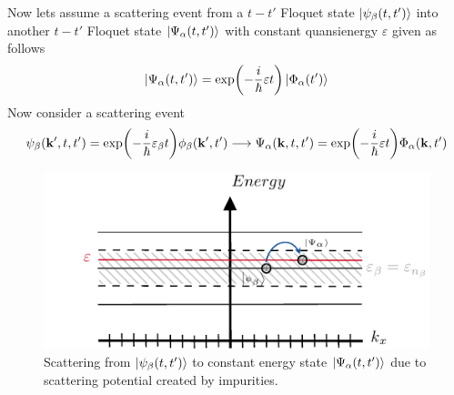 \vspace{5mm}
\noindent
Now lets assume a scattering event from a $t-t'$ Floquet state $\ket{\psi_{\beta}(t,t')}$ into another $t-t'$ Floquet state $\ket{\Psi_{\alpha}(t,t')}$ with constant quansienergy $\varepsilon$ given as follows
\begin{equation} \label{4.19}
  \ket{\Psi_{\alpha}(t,t')} =
  \exp(-\frac{i}{\hbar}\varepsilon t)
  \ket{\Phi_{\alpha}(t')}
\end{equation}
Now consider a scattering event
\begin{equation} \label{4.20}
  \psi_{\beta}(\mathbf{k'},t,t') = \exp(-\frac{i}{\hbar}\varepsilon_{\beta} t)
  \phi_{\beta}(\mathbf{k'},t')
  \longrightarrow
  \Psi_{\alpha}(\mathbf{k},t,t') = \exp(-\frac{i}{\hbar}\varepsilon t)
  \Phi_{\alpha}(\mathbf{k},t')
\end{equation}
\begin{figure}[ht!]
  \centering
  \includegraphics[scale=1.0]{figures/fig2.pdf}
  \caption{Scattering from $\ket{\psi_{\beta}(t,t')}$ to constant energy state $\ket{\Psi_{\alpha}(t,t')}$ due to scattering potential created by impurities.}
  \label{fig:2}
\end{figure}

